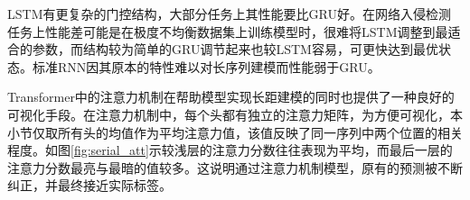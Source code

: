 LSTM有更复杂的门控结构，大部分任务上其性能要比GRU好。在网络入侵检测任务上性能差可能是在极度不均衡数据集上训练模型时，很难将LSTM调整到最适合的参数，而结构较为简单的GRU调节起来也较LSTM容易，可更快达到最优状态。标准RNN因其原本的特性难以对长序列建模而性能弱于GRU。

Transformer中的注意力机制在帮助模型实现长距建模的同时也提供了一种良好的可视化手段。在注意力机制中，每个头都有独立的注意力矩阵，为方便可视化，本小节仅取所有头的均值作为平均注意力值，该值反映了同一序列中两个位置的相关程度。如图\ref{fig:serial_att}示较浅层的注意力分数往往表现为平均，而最后一层的注意力分数最亮与最暗的值较多。这说明通过注意力机制模型，原有的预测被不断纠正，并最终接近实际标签。

\begin{figure}[htbp] %
\centering %


\end{figure}
